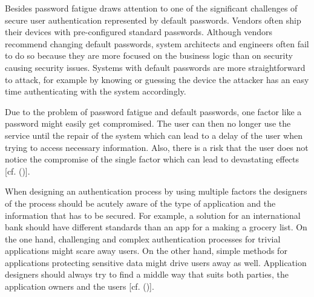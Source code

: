 Besides password fatigue \cite{Todorov:2007:MUI} draws attention to one of the significant challenges of secure user authentication represented by default passwords. Vendors often ship their devices with pre-configured standard passwords. Although vendors recommend changing default passwords, system architects and engineers often fail to do so because they are more focused on the business logic than on security causing security issues. Systems with default passwords are more straightforward to attack, for example by knowing or guessing the device the attacker has an easy time authenticating with the system accordingly. 


Due to the problem of password fatigue and default passwords, one factor like a password might easily get compromised. The user can then no longer use the service until the repair of the system which can lead to a delay of the user when trying to access necessary information. Also, there is a risk that the user does not notice the compromise of the single factor which can lead to devastating effects [cf. (\cite{Dasgupta:2017:AUA})]. 

When designing an authentication process by using multiple factors the designers of the process should be acutely aware of the type of application and the information that has to be secured. For example, a solution for an international bank should have different standards than an app for a making a grocery list. On the one hand, challenging and complex authentication processes for trivial applications might scare away users. On the other hand, simple methods for applications protecting sensitive data might drive users away as well. Application designers should always try to find a middle way that suits both parties, the application owners and the users [cf. (\cite{NIST:2017:DIG})]. 

